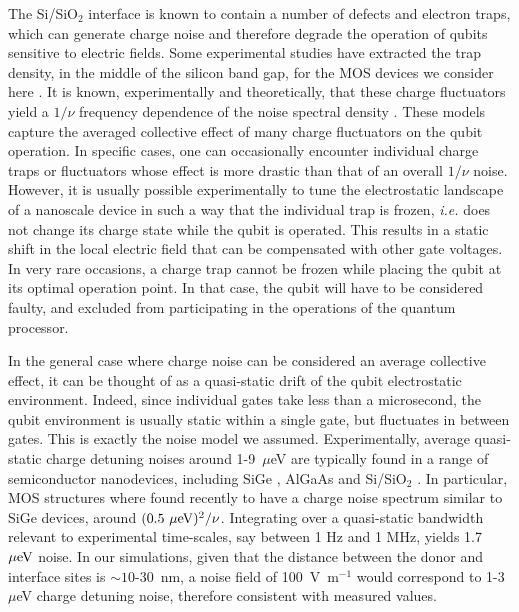 \documentclass[aps,prb,superscriptaddress,nobibnotes,twocolumn]{revtex4-1}
\begin{document}
The Si/SiO$_2$ interface is known to contain a number of defects and electron traps, which can generate charge noise and therefore degrade the operation of qubits sensitive to electric fields. Some experimental studies have extracted the trap density, in the middle of the silicon band gap, for the MOS devices we consider here \cite{Johnson2010S}. It is known, experimentally and theoretically, that these charge fluctuators yield a $1/\nu$ frequency dependence of the noise spectral density \cite{Paladino2014S}. These models capture the averaged collective effect of many charge fluctuators on the qubit operation. In specific cases, one can occasionally encounter individual charge traps or fluctuators whose effect is more drastic than that of an overall $1/\nu$ noise. However, it is usually possible experimentally to tune the electrostatic landscape of a nanoscale device in such a way that the individual trap is frozen, \textit{i.e.} does not change its charge state while the qubit is operated. This results in a static shift in the local electric field that can be compensated with other gate voltages. In very rare occasions, a charge trap cannot be frozen while placing the qubit at its optimal operation point. In that case, the qubit will have to be considered faulty, and excluded from participating in the operations of the quantum processor.

In the general case where charge noise can be considered an average collective effect, it can be thought of as a quasi-static drift of the qubit electrostatic environment. Indeed, since individual gates take less than a microsecond, the qubit environment is usually static within a single gate, but fluctuates in between gates. This is exactly the noise model we assumed. Experimentally, average quasi-static charge detuning noises around 1-9~$\mu$eV are typically found in a range of semiconductor nanodevices, including SiGe \cite{Kim2015S,Thorgrimsson2016S,Freeman2016S}, AlGaAs \cite{Dial2013S} and Si/SiO$_2$ \cite{Harvey-Collard2015S,Freeman2016S}. In particular, MOS structures where found recently \cite{Freeman2016S} to have a charge noise spectrum similar to SiGe devices, around $(0.5~{\rm \mu eV})^2/\nu$. Integrating over a quasi-static bandwidth relevant to experimental time-scales, say between 1 Hz  and 1 MHz, yields 1.7~${\rm \mu eV}$ noise. In our simulations, given that the distance between the donor and interface sites is $\sim10$-30~nm, a noise field of 100~V~m$^{-1}$ would correspond to 1-3~$\mu$eV charge detuning noise, therefore consistent with measured values.
\end{document}
